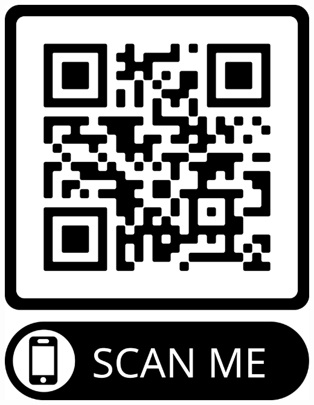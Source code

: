 \documentclass[a0paper,portrait]{baposter}
\begin{document}
\begin{poster}
{{        \hspace{2.6cm}
        \centering
    	\includegraphics[scale=.015]{images/qr.png}
    }
}

\end{poster}
\end{document}
